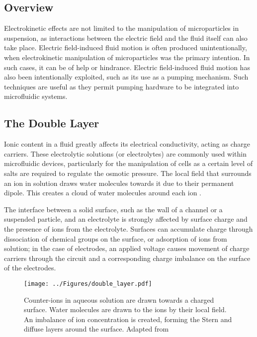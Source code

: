 \subsection{Overview}
Electrokinetic effects are not limited to the manipulation of microparticles in suspension, as interactions between the electric field and the fluid itself can also take place. Electric field-induced fluid motion is often produced unintentionally, when electrokinetic manipulation of microparticles was the primary intention. In such cases, it can be of help or hindrance. Electric field-induced fluid motion has also been intentionally exploited, such as its use as a pumping mechanism. Such techniques are useful as they permit pumping hardware to be integrated into microfluidic systems.

\subsection{The Double Layer}
Ionic content in a fluid greatly affects its electrical conductivity, acting as charge carriers. These electrolytic solutions (or electrolytes) are commonly used within microfluidic devices, particularly for the manipulation of cells as a certain level of salts are required to regulate the osmotic pressure. The local field that surrounds an ion in solution draws water molecules towards it due to their permanent dipole. This creates a cloud of water molecules around each ion \citep{Morgan:2003}.

The interface between a solid surface, such as the wall of a channel or a suspended particle, and an electrolyte is strongly affected by surface charge and the presence of ions from the electrolyte. Surfaces can accumulate charge through dissociation of chemical groups on the surface, or adsorption of ions from solution; in the case of electrodes, an applied voltage causes movement of charge carriers through the circuit and a corresponding charge imbalance on the surface of the electrodes.

\begin{figure}
 \centering
 \texttt{[image: ../Figures/double\_layer.pdf]}
 \caption[Double layer formation at a charged surface.]{Counter-ions in aqueous solution are drawn towards a charged surface. Water molecules are drawn to the ions by their local field. An imbalance of ion concentration is created, forming the Stern and diffuse layers around the surface. Adapted from \cite{Morgan:2003}}
 \label{fig:double_layer}
\end{figure}

